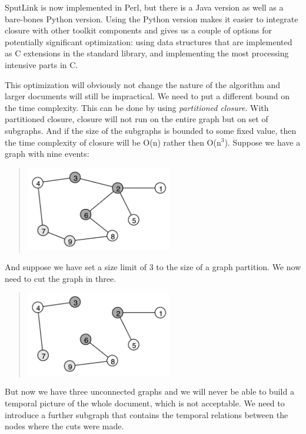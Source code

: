 \documentclass[11pt]{article}
\begin{document}
SputLink is now implemented in Perl, but there is a Java version as well as a bare-bones Python version. Using the Python version makes it easier to integrate closure with other toolkit components and gives us a couple of options for potentially significant optimization: using data structures that are implemented as C extensions in the standard library, and implementing the most processing intensive parts in C.

This optimization will obviously not change the nature of the algorithm and larger documents will still be impractical. We need to put a different bound on the time complexity. This can be done by using {\em partitioned closure}. With partitioned closure, closure will not run on the entire graph but on set of subgraphs. And if the size of the subgraphs is bounded to some fixed value, then the time complexity of closure will be O(n) rather then O(n$^3$). Suppose we have a graph with nine events:

\begin{quote}
\includegraphics[width=2.5in]{images/closure1.png} 
\end{quote}

And suppose we have set a size limit of 3 to the size of a graph partition. We now need to cut the graph in three.

\begin{quote}
\includegraphics[width=2.5in]{images/closure2.png} 
\end{quote}

But now we have three unconnected graphs and we will never be able to build a temporal picture of the whole document, which is not acceptable. We need to introduce a further subgraph that contains the temporal relations between the nodes where the cuts were made.
\end{document}
